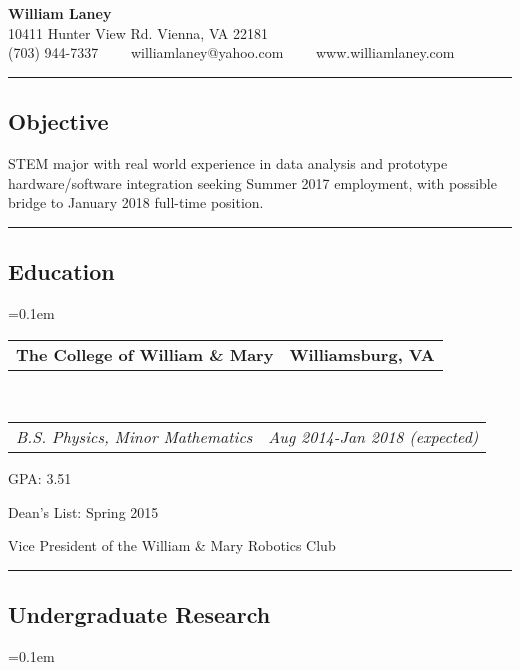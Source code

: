 \documentclass[10pt,letterpaper]{article}
\makeatletter
\newenvironment{indentsection}[1]%
{\begin{list}{}%
	{\setlength{\leftmargin}{#1}}%
	\item[]%
}
{\end{list}}
\newcommand{\headerrow}[2]
{\begin{tabular*}{\linewidth}{l@{\extracolsep{\fill}}r}
	#1 &
	#2 \\
\end{tabular*}}
\makeatother
\begin{document}
\begin{center}
{\LARGE \textbf{William Laney}}\\
\vspace{0.1em}
10411 Hunter View Rd.
Vienna, VA 22181
\\
(703) 944-7337\ \ \textbullet
\ \ williamlaney@yahoo.com\ \ \textbullet
\ \ www.williamlaney.com
\end{center}

\hrule
\vspace{-0.4em}
\subsection*{Objective}

\begin{indentsection}{\parindent}
STEM major with real world experience in data analysis and
prototype hardware/software integration seeking Summer 2017 employment,
with possible bridge to January 2018 full-time position.
\end{indentsection}


\hrule
\vspace{-0.4em}
\subsection*{Education}

	\parskip=0.1em

	\headerrow
		{\textbf{The College of William \& Mary}}
		{\textbf{Williamsburg, VA}}
	\\
	\headerrow
		{\emph{B.S. Physics, Minor Mathematics}}
		{\emph{Aug 2014-Jan 2018 (expected)}}
	\begin{itemize*}
		\item GPA: 3.51
		\item Dean's List: Spring 2015
		\item Vice President of the William \& Mary Robotics Club
	\end{itemize*}



\hrule
\vspace{-0.4em}
\subsection*{Undergraduate Research}

	\parskip=0.1em
\end{document}

